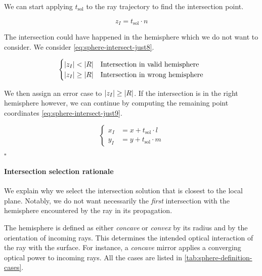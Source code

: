 We can start applying $t_\textrm{sol}$ to the ray trajectory to find
the intersection point.

\begin{equation}
z_I = t_\textrm{sol} \cdot n
\end{equation}

The intersection could have happened in the hemisphere which we do
not want to consider. We consider \cref{eq:sphere-intersect-just8}.

\begin{equation} \label{eq:sphere-intersect-just8}
\begin{cases}
\abs{z_I} < \abs{R} & \text{Intersection in valid hemisphere} \\
\abs{z_I} \geq \abs{R} & \text{Intersection in wrong hemisphere}
\end{cases}
\end{equation}

We then assign an error case to $\abs{z_I} \geq \abs{R}$. If the intersection
is in the right hemisphere however, we can continue by computing
the remaining point coordinates \cref{eq:sphere-intersect-just9}.

\begin{equation} \label{eq:sphere-intersect-just9}
\begin{cases}
x_I &= x + t_\textrm{sol} \cdot l \\
y_I &= y + t_\textrm{sol} \cdot m
\end{cases} \end{equation}

$\square$

\paragraph{Intersection selection rationale}
\label{sec:sphere-intersection-selection}

We explain why we select the intersection solution that is closest to
the local plane. Notably, we do not want necessarily the \emph{first}
intersection with the hemisphere encountered by the ray in its propagation.

The hemisphere is defined as either \emph{concave} or \emph{convex} by its
radius and by the orientation of incoming rays. This determines
the intended optical interaction of the ray with the surface.  For instance, a
\emph{concave} mirror applies a converging optical power to incoming rays. All
the cases are listed in \cref{tab:sphere-definition-cases}.

